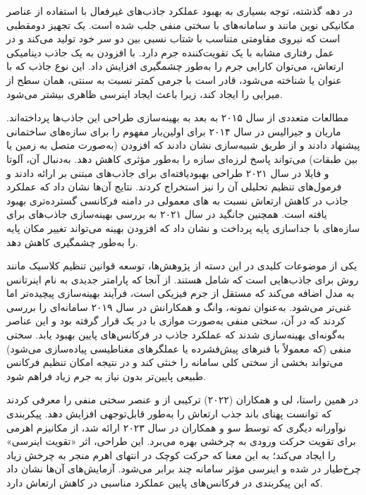 در دهه گذشته، توجه بسیاری به بهبود عملکرد جاذب‌های غیرفعال با استفاده از عناصر مکانیکی نوین مانند  و سامانه‌های با سختی منفی جلب شده است.  یک تجهیز دومقطبی است که نیروی مقاومتی متناسب با شتاب نسبی بین دو سر خود تولید می‌کند و در عمل رفتاری مشابه با یک تقویت‌کننده جرم دارد\cite{ghaedi2017invited}\cite{wei2025comparative}\cite{fahimi2025seismic}\cite{jiang2025optimal}\cite{smith2020inerter}. با افزودن  به یک جاذب دینامیکی ارتعاش، می‌توان کارایی جرم را به‌طور چشمگیری افزایش داد. این نوع جاذب که با عنوان  یا  شناخته می‌شود، قادر است با جرمی کمتر نسبت به  سنتی، همان سطح از میرایی را ایجاد کند، زیرا  باعث ایجاد اینرسی ظاهری بیشتر می‌شود.

مطالعات متعددی از سال ۲۰۱۵ به بعد به بهینه‌سازی طراحی این جاذب‌ها پرداخته‌اند. ماریان و جیرالیس در سال ۲۰۱۴ برای اولین‌بار مفهوم  را برای سازه‌های ساختمانی پیشنهاد دادند و از طریق شبیه‌سازی نشان دادند که افزودن  (به‌صورت متصل به زمین یا بین طبقات) می‌تواند پاسخ لرزه‌ای سازه را به‌طور مؤثری کاهش دهد\cite{marian2014optimal}. به‌دنبال آن، آلوتا و فایلا در سال ۲۰۲۱ طراحی بهبودیافته‌ای برای جاذب‌های مبتنی بر  ارائه دادند و فرمول‌های تنظیم تحلیلی آن را نیز استخراج کردند\cite{alotta2021improved}. نتایج آن‌ها نشان داد که عملکرد جاذب در کاهش ارتعاش نسبت به های معمولی در دامنه فرکانسی گسترده‌تری بهبود یافته است. همچنین جانگید در سال ۲۰۲۱ به بررسی بهینه‌سازی جاذب‌های  برای سازه‌های با جداسازی پایه پرداخت و نشان داد که افزودن  بهینه می‌تواند تغییر مکان پایه را به‌طور چشمگیری کاهش دهد\cite{jangid2021optimum}.

یکی از موضوعات کلیدی در این دسته از پژوهش‌ها، توسعه قوانین تنظیم کلاسیک مانند روش  برای جاذب‌هایی است که شامل  هستند. از آنجا که  پارامتر جدیدی به نام اینرتانس به مدل اضافه می‌کند که مستقل از جرم فیزیکی است، فرآیند بهینه‌سازی پیچیده‌تر اما غنی‌تر می‌شود. به‌عنوان نمونه، وانگ و همکارانش در سال ۲۰۱۹ سامانه‌ای را بررسی کردند که در آن، سختی منفی به‌صورت موازی با  در یک  قرار گرفته بود و این عناصر به‌گونه‌ای بهینه‌سازی شدند که عملکرد جاذب در فرکانس‌های پایین بهبود یابد\cite{wang2019parameters}. سختی منفی (که معمولاً با فنرهای پیش‌فشرده یا عملگرهای مغناطیسی پیاده‌سازی می‌شود) می‌تواند بخشی از سختی کلی سامانه را خنثی کند و در نتیجه امکان تنظیم فرکانس طبیعی پایین‌تر بدون نیاز به جرم زیاد فراهم شود.

در همین راستا، لی و همکاران (۲۰۲۲) ترکیبی از  و عنصر سختی منفی را معرفی کردند که توانست پهنای باند جذب ارتعاش را به‌طور قابل‌توجهی افزایش دهد\cite{zheng2022energy}. پیکربندی نوآورانه دیگری که توسط سو و همکاران در سال ۲۰۲۳ ارائه شد، از مکانیزم اهرمی برای تقویت حرکت ورودی به  چرخشی بهره می‌برد. این طراحی، اثر «تقویت اینرسی» را ایجاد می‌کند؛ به این معنا که حرکت کوچک در انتهای اهرم منجر به چرخش زیاد چرخ‌طیار در  شده و اینرسی مؤثر سامانه چند برابر می‌شود. آزمایش‌های آن‌ها نشان داد که این پیکربندی در فرکانس‌های پایین عملکرد مناسبی در کاهش ارتعاش دارد\cite{su2023analytical}.

